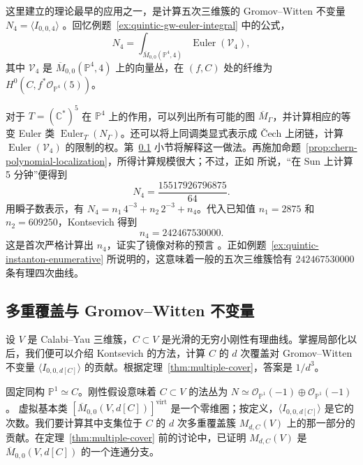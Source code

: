 \begin{example}\label{ex:quintic-quartics-localization}
这里建立的理论最早的应用之一，是计算五次三维簇的 Gromov--Witten 不变量 $N_4=\langle I_{0,0,4}\rangle$ 。回忆例题~\ref{ex:quintic-gw-euler-integral} 中的公式，
\[
N_4=\int_{\overline M_{0,0}(\mathbb P^4,4)}\operatorname{Euler}(\mathcal V_4),
\]
其中 $\mathcal V_4$ 是 $\overline M_{0,0}(\mathbb P^4,4)$ 上的向量丛，在 $(f,C)$ 处的纤维为 $H^0(C,f^*\mathcal O_{\mathbb P^4}(5))$。

对于 $T=(\mathbb C^*)^5$ 在 $\mathbb P^4$ 上的作用，可以列出所有可能的图 $\overline M_\Gamma$，并计算相应的等变 Euler 类 $\operatorname{Euler}_T(N_\Gamma)$。还可以将上同调类显式表示成 Čech 上闭链，计算 $\operatorname{Euler}(\mathcal V_4)$ 的限制的权。第~\ref{subsec:multiple-cover-localization} 小节将解释这一做法。再施加命题~\ref{prop:chern-polynomial-localization}，所得计算规模很大；不过，正如  所说，“在 Sun 上计算 5 分钟”便得到
\[
N_4=\frac{15517926796875}{64}.
\]
用瞬子数表示，有 $N_4=n_1\,4^{-3}+n_2\,2^{-3}+n_4$。代入已知值 $n_1=2875$ 和 $n_2=609250$，Kontsevich 得到
\[
n_4=242467530000.
\]
这是首次严格计算出 $n_4$，证实了镜像对称的预言 。正如例题~\ref{ex:quintic-instanton-enumerative} 所说明的，这意味着一般的五次三维簇恰有 $242467530000$ 条有理四次曲线。
\end{example}

\subsection{多重覆盖与 Gromov--Witten 不变量}\label{subsec:multiple-cover-localization}
设 $V$ 是 Calabi--Yau 三维簇，$C\subset V$ 是光滑的无穷小刚性有理曲线。掌握局部化以后，我们便可以介绍 Kontsevich 的方法，计算 $C$ 的 $d$ 次覆盖对 Gromov--Witten 不变量 $\langle I_{0,0,d[C]}\rangle$ 的贡献。根据定理~\ref{thm:multiple-cover}，答案是 $1/d^3$。

固定同构 $\mathbb P^1\simeq C$。刚性假设意味着 $C\subset V$ 的法丛为 $N\simeq\mathcal O_{\mathbb P^1}(-1)\oplus\mathcal O_{\mathbb P^1}(-1)$。
虚拟基本类 $[\overline M_{0,0}(V,d[C])]^{\mathrm{virt}}$ 是一个零维圈；按定义，$\langle I_{0,0,d[C]}\rangle$ 是它的次数。我们要计算其中支集位于 $C$ 的 $d$ 次多重覆盖簇 $M_{d,C}(V)$ 上的那一部分的贡献。在定理~\ref{thm:multiple-cover} 前的讨论中，已证明 $M_{d,C}(V)$ 是 $\overline M_{0,0}(V,d[C])$ 的一个连通分支。

